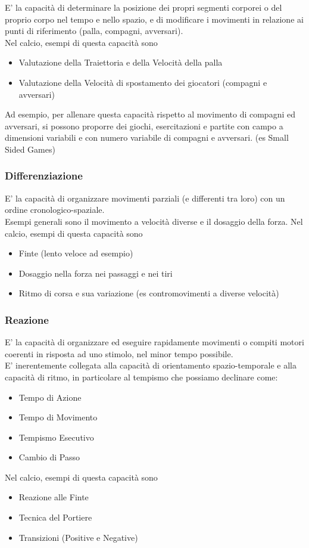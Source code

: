 \documentclass[../uefaC.tex]{subfiles}
\begin{document}
E' la capacità di determinare la posizione dei propri segmenti corporei o del proprio corpo nel tempo e nello spazio, e di modificare i movimenti in relazione ai punti di riferimento (palla, compagni, avversari). \hfill \\
Nel calcio, esempi di questa capacità sono
\begin{itemize}
    \item Valutazione della Traiettoria e della Velocità della palla
    \item Valutazione della Velocità di spostamento dei giocatori (compagni e avversari)
\end{itemize}
Ad esempio, per allenare questa capacità rispetto al movimento di compagni ed avversari, si possono proporre dei giochi, esercitazioni e partite con campo a dimensioni variabili e con numero variabile di compagni e avversari. (es Small Sided Games)

\subsubsection{Differenziazione}

E' la capacità di organizzare movimenti parziali (e differenti tra loro) con un ordine cronologico-spaziale. \hfill \\
Esempi generali sono il movimento a velocità diverse e il dosaggio della forza. Nel calcio, esempi di questa capacità sono
\begin{itemize}
    \item Finte (lento veloce ad esempio)
    \item Dosaggio nella forza nei passaggi e nei tiri
    \item Ritmo di corsa e sua variazione (es contromovimenti a diverse velocità)
\end{itemize}


\subsubsection{Reazione}

E' la capacità di organizzare ed eseguire rapidamente movimenti o compiti motori coerenti in risposta ad uno stimolo, nel minor tempo possibile. \hfill \\
E' inerentemente collegata alla capacità di orientamento spazio-temporale e alla capacità di ritmo, in particolare al tempismo che possiamo declinare come:
\begin{itemize}
    \item Tempo di Azione
    \item Tempo di Movimento
    \item Tempismo Esecutivo
    \item Cambio di Passo
\end{itemize}
Nel calcio, esempi di questa capacità sono
\begin{itemize}
    \item Reazione alle Finte
    \item Tecnica del Portiere
    \item Transizioni (Positive e Negative)
\end{itemize}
\end{document}
